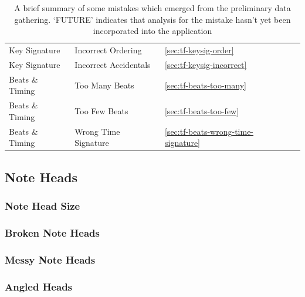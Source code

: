 \begin{table}[H]
\begin{tabularx}{\textwidth}{ llll }
        Key Signature   & Incorrect Ordering     & \cref{sec:tf-keysig-order}                & \\
        Key Signature   & Incorrect Accidentals  & \cref{sec:tf-keysig-incorrect}            & \\
        Beats \& Timing & Too Many Beats         & \cref{sec:tf-beats-too-many}              & \\
        Beats \& Timing & Too Few Beats          & \cref{sec:tf-beats-too-few}               & \\
        Beats \& Timing & Wrong Time Signature   & \cref{sec:tf-beats-wrong-time-signature}  & \\

        \bottomrule
    \end{tabularx}
    \caption{A brief summary of some mistakes which emerged from the preliminary data gathering. `FUTURE' indicates that analysis for the mistake hasn't yet been incorporated into the application}
    \label{table:note-lengths}
\end{table}


\subsection{Note Heads}
\subsubsection{Note Head Size}\label{sec:tf-note-head-size}

\subsubsection{Broken Note Heads}\label{sec:tf-note-head-broken}

\subsubsection{Messy Note Heads}\label{sec:tf-note-head-messy}

\subsubsection{Angled Heads}\label{sec:tf-note-head-angled}



